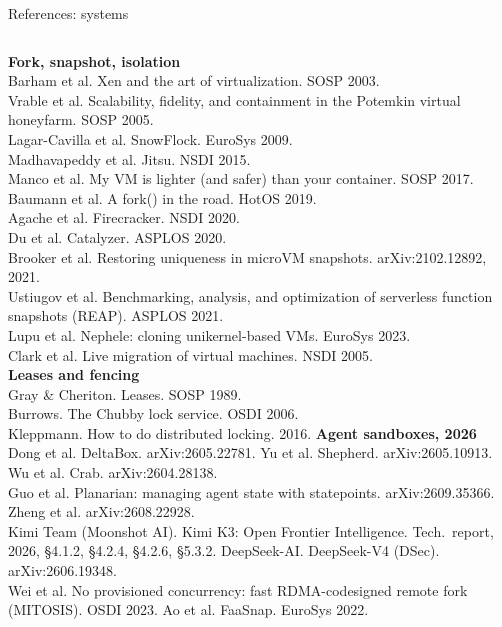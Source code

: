 \begin{frame}[t]{References: systems}
\vspace{0pt}
{\fontsize{6.1}{7.2}\selectfont
\begin{columns}[T,onlytextwidth]
\textbf{Fork, snapshot, isolation}\\
Barham et al. Xen and the art of virtualization. SOSP 2003.\\
Vrable et al. Scalability, fidelity, and containment in the Potemkin virtual honeyfarm. SOSP 2005.\\
Lagar-Cavilla et al. SnowFlock. EuroSys 2009.\\
Madhavapeddy et al. Jitsu. NSDI 2015.\\
Manco et al. My VM is lighter (and safer) than your container. SOSP 2017.\\
Baumann et al. A fork() in the road. HotOS 2019.\\
Agache et al. Firecracker. NSDI 2020.\\
Du et al. Catalyzer. ASPLOS 2020.\\
Brooker et al. Restoring uniqueness in microVM snapshots. arXiv:2102.12892, 2021.\\
Ustiugov et al. Benchmarking, analysis, and optimization of serverless function snapshots (REAP). ASPLOS 2021.\\
Lupu et al. Nephele: cloning unikernel-based VMs. EuroSys 2023.\\
Clark et al. Live migration of virtual machines. NSDI 2005.\\[4pt]
\textbf{Leases and fencing}\\
Gray \& Cheriton. Leases. SOSP 1989.\\
Burrows. The Chubby lock service. OSDI 2006.\\
Kleppmann. How to do distributed locking. 2016.
\textbf{Agent sandboxes, 2026}\\
Dong et al. DeltaBox. arXiv:2605.22781. Yu et al. Shepherd. arXiv:2605.10913. Wu et al. Crab. arXiv:2604.28138.\\
Guo et al. Planarian: managing agent state with statepoints. arXiv:2609.35366. Zheng et al. arXiv:2608.22928.\\
Kimi Team (Moonshot AI). Kimi K3: Open Frontier Intelligence. Tech.\ report, 2026, \S4.1.2, \S4.2.4, \S4.2.6, \S5.3.2. DeepSeek-AI. DeepSeek-V4 (DSec). arXiv:2606.19348.\\
Wei et al. No provisioned concurrency: fast RDMA-codesigned remote fork (MITOSIS). OSDI 2023. Ao et al. FaaSnap. EuroSys 2022.\\[4pt]

\end{columns}}
\end{frame}
